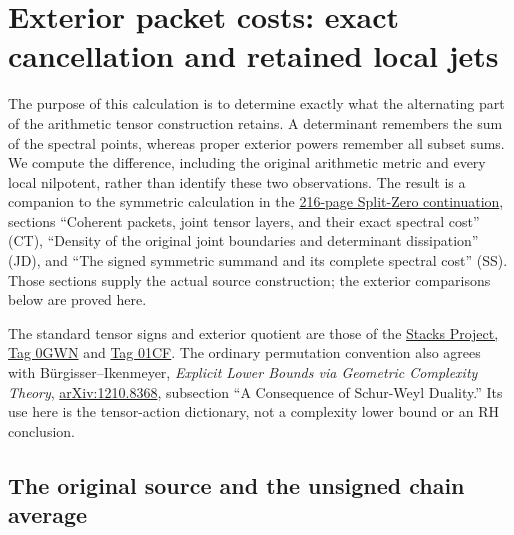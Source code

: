 \section{Exterior packet costs: exact cancellation and retained local jets}
\label{sec:alternating-packet-cost}

The purpose of this calculation is to determine exactly what the alternating
part of the arithmetic tensor construction retains.  A determinant remembers
the sum of the spectral points, whereas proper exterior powers remember all
subset sums.  We compute the difference, including the original arithmetic
metric and every local nilpotent, rather than identify these two observations.
The result is a companion to the symmetric calculation in the
\href{https://doi.org/10.5281/zenodo.22728704}{216-page Split-Zero continuation},
sections ``Coherent packets, joint tensor layers, and their exact spectral
cost'' (CT), ``Density of the original joint boundaries and determinant
dissipation'' (JD), and ``The signed symmetric summand and its complete
spectral cost'' (SS).  Those sections supply the actual source construction;
the exterior comparisons below are proved here.

The standard tensor signs and exterior quotient are those of the
\href{https://stacks.math.columbia.edu/tag/0GWN}{Stacks Project, Tag 0GWN}
and \href{https://stacks.math.columbia.edu/tag/01CF}{Tag 01CF}.
The ordinary permutation convention also agrees with B\"urgisser--Ikenmeyer,
\emph{Explicit Lower Bounds via Geometric Complexity Theory},
\href{https://arxiv.org/abs/1210.8368}{arXiv:1210.8368}, subsection
``A Consequence of Schur-Weyl Duality.''  Its use here is the tensor-action
dictionary, not a complexity lower bound or an RH conclusion.

\subsection{The original source and the unsigned chain average}

